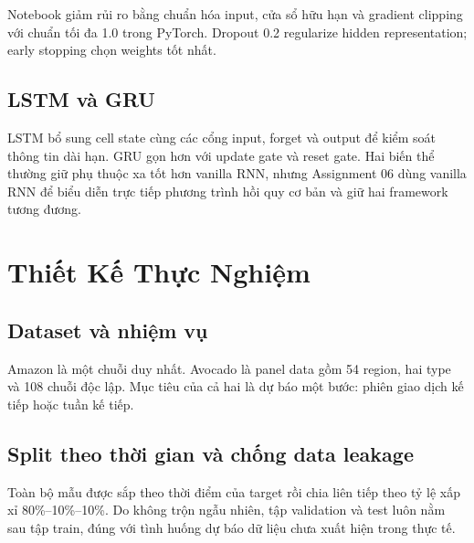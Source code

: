 \documentclass[12pt,a4paper]{report}
\begin{document}
Notebook giảm rủi ro bằng chuẩn hóa input, cửa sổ hữu hạn và gradient clipping với chuẩn tối đa 1.0
trong PyTorch. Dropout 0.2 regularize hidden representation; early stopping chọn weights tốt nhất.

\section{LSTM và GRU}
LSTM bổ sung cell state cùng các cổng input, forget và output để kiểm soát thông tin dài hạn.
GRU gọn hơn với update gate và reset gate. Hai biến thể thường giữ phụ thuộc xa tốt hơn vanilla RNN,
nhưng Assignment 06 dùng vanilla RNN để biểu diễn trực tiếp phương trình hồi quy cơ bản và giữ hai
framework tương đương.

\chapter{Thiết Kế Thực Nghiệm}

\section{Dataset và nhiệm vụ}
\begin{table}[H]
\centering
\caption{Tổng quan hai dataset của Assignment 06}
\label{tab:dataset_overview}
\end{table}

Amazon là một chuỗi duy nhất. Avocado là panel data gồm 54 region, hai type và 108 chuỗi độc lập.
Mục tiêu của cả hai là dự báo một bước: phiên giao dịch kế tiếp hoặc tuần kế tiếp.

\section{Split theo thời gian và chống data leakage}
Toàn bộ mẫu được sắp theo thời điểm của target rồi chia liên tiếp theo tỷ lệ xấp xỉ 80\%--10\%--10\%.
Do không trộn ngẫu nhiên, tập validation và test luôn nằm sau tập train, đúng với tình huống dự báo dữ
liệu chưa xuất hiện trong thực tế.
\end{document}
